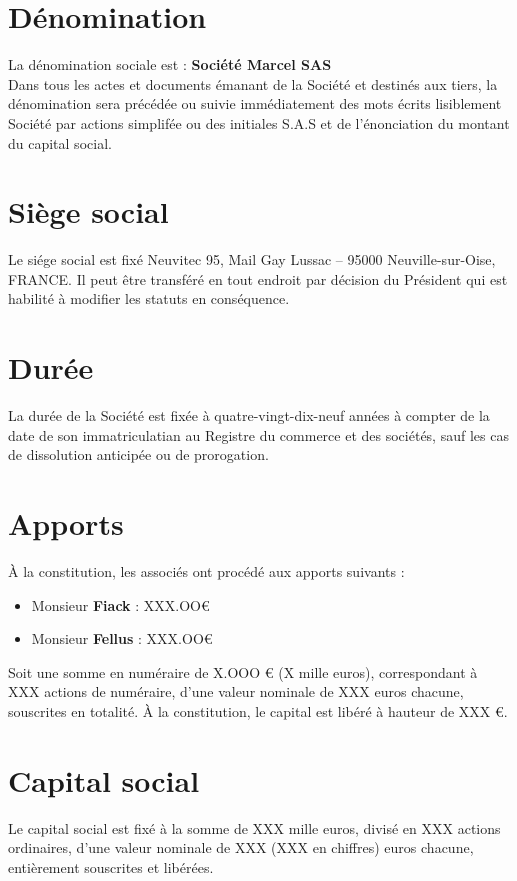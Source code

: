 \documentclass[a4paper,12pt]{report}
\newcommand{\address}{Neuvitec 95, Mail Gay Lussac -- 95000 Neuville-sur-Oise, FRANCE}
\begin{document}
\section{Dénomination}
La dénomination sociale est : \og \textbf{Société Marcel SAS} \fg{}\\
Dans tous les actes et documents émanant de la Société et destinés aux tiers, 
la dénomination sera précédée ou suivie immédiatement des mots écrits lisiblement \og Société par actions simplifée \fg{} 
ou des initiales \og S.A.S \fg{} et de l'énonciation du montant du capital social.

\section{Siège social}
Le siége social est fixé \address. 
Il peut être transféré en tout endroit par décision du Président qui est habilité à modifier les statuts en conséquence.

\section{Durée}
La durée de la Société est fixée à quatre-vingt-dix-neuf années à compter de la date de son immatriculatian au Registre du commerce et des sociétés, 
sauf les cas de dissolution anticipée ou de prorogation.

\section{Apports}
À la constitution, les associés ont procédé aux apports suivants :
\begin{itemize}
	\item Monsieur \textbf{Fiack} :         XXX.OO€
	\item Monsieur \textbf{Fellus} :         XXX.OO€
\end{itemize}

Soit une somme en numéraire de X.OOO € (X mille euros), correspondant à XXX actions de numéraire, d'une valeur nominale de XXX euros chacune, souscrites en totalité. 
À la constitution, le capital est libéré à hauteur de XXX €.

\section{Capital social}
Le capital social est fixé à la somme de XXX mille euros, divisé en XXX actions ordinaires,
d'une valeur nominale de XXX (XXX en chiffres) euros chacune, entièrement souscrites et libérées.
\end{document}
